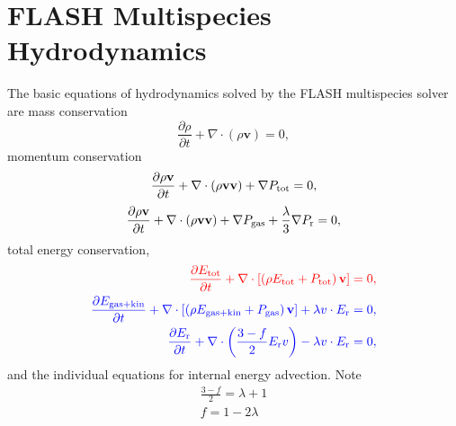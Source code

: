 \documentclass[preprint,11pt]{aastex}
\newcommand{\beq}{\begin{equation}}
\newcommand{\eeq}{\end{equation}}
\newcommand{\bea}{\begin{eqnarray}}
\newcommand{\eea}{\end{eqnarray}}
\begin{document}
\section{FLASH Multispecies Hydrodynamics}
\label{sec:hydro}
The basic equations of hydrodynamics solved by the FLASH multispecies solver are mass conservation
\beq 
\label{eq:e1}
\frac{\partial \rho}{\partial t} + \nabla \cdot (\rho \mathbf{v}) = 0, 
\eeq
momentum conservation
{\color{red}
\beq
\label{eq:e2}
\frac{\partial \rho\mathbf{v}}{\partial t} + \nabla \cdot (\rho\mathbf{v}\mathbf{v}) + \nabla P_{\rm tot} = 0,
\eeq
}
{\color{blue}
\beq
\label{eq:newmom}
\frac{\partial \rho\mathbf{v}}{\partial t} + \nabla \cdot (\rho\mathbf{v}\mathbf{v}) + \nabla P_{\rm gas} + \frac{\lambda}{3} \nabla P_{\rm r}= 0,
\eeq
}
total energy conservation,
\bea
{\color{red}
	\label{eq:e3}
	\frac{\partial E_{\rm tot}}{\partial t} + \nabla \cdot \left[ \left( \rho E_{\rm tot} + P_{\rm tot} \right) \mathbf{v} \right] = 0,
}\\
{\color{blue}
	\label{eq:e3}
	\frac{\partial E_{\rm gas+kin}}{\partial t} + \nabla \cdot \left[ \left( \rho E_{\rm gas+kin} + P_{\rm gas} \right) \mathbf{v} \right] + \lambda v \cdot E_{\rm r} = 0,
}\\
{\color{blue}
	\frac{\partial E_{\rm r}}{\partial t} + \nabla \cdot \left( \frac{3-f}{2} E_{\rm r} v \right)- \lambda v \cdot E_{\rm r} = 0,
}
\eea
and the individual equations for internal energy advection.  Note
\bea
\frac{3-f}{2} = \lambda + 1 \nonumber \\
f = 1 - 2 \lambda
\eea
\end{document}
